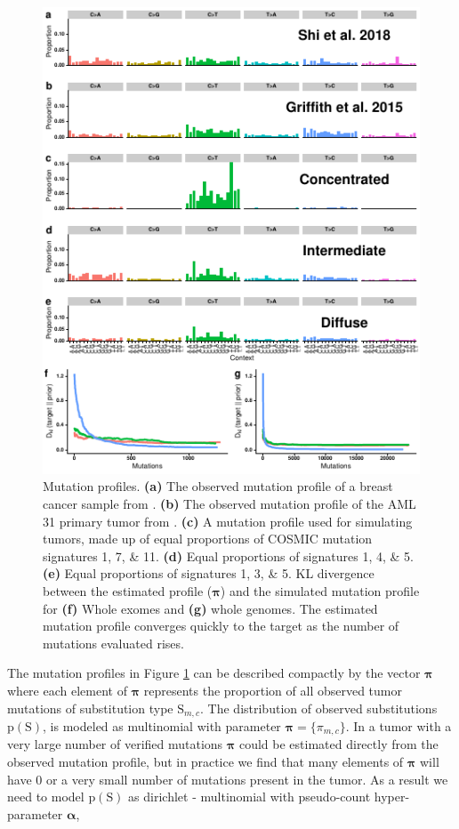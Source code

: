 \documentclass[a4,center,fleqn]{NAR}
\begin{document}
\begin{figure}[t]
  \begin{center}
  \includegraphics{figures/signature_figure.pdf}
  \end{center}
  \caption{Mutation profiles. 
  \textbf{(a)} The observed mutation profile of a breast cancer sample from \cite{Shi2018}.
  \textbf{(b)} The observed mutation profile of the AML 31 primary tumor from \cite{Griffith2015}.
  \textbf{(c)} A mutation profile used for simulating tumors, made up of equal proportions of COSMIC mutation signatures 1, 7, \& 11.
  \textbf{(d)} Equal proportions of signatures 1, 4, \& 5.
  \textbf{(e)} Equal proportions of signatures 1, 3, \& 5.
  KL divergence between the estimated profile ($\boldsymbol{\pi}$) and the simulated mutation profile for \textbf{(f)} Whole exomes and \textbf{(g)} whole genomes.
  The estimated mutation profile converges quickly to the target as the number of mutations evaluated rises.
  }
  \label{NAR-sigfig}
  \end{figure}


The mutation profiles in Figure \ref{NAR-sigfig} can be described compactly by the vector $\boldsymbol{\pi}$ where each element of $\boldsymbol{\pi}$ represents the proportion of all observed tumor mutations of substitution type $\mathrm{S}_{m,c}$.
The distribution of observed substitutions $ \mathrm{p}(\mathrm{S}) $, is modeled as multinomial with parameter $ \boldsymbol{ \pi } = \{\pi_{m,c}\} $.
In a tumor with a very large number of verified mutations $\boldsymbol{\pi}$ could be estimated directly from the observed mutation profile, but in practice we find that many elements of $\boldsymbol{\pi}$ will have $0$ or a very small number of mutations present in the tumor.
As a result we need to model $\mathrm{p}(\mathrm{S})$ as dirichlet - multinomial with pseudo-count hyper-parameter $\boldsymbol{\alpha}$, 
\end{document}
